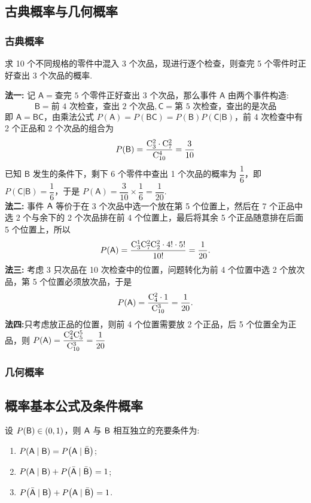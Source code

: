 \subsection{古典概率与几何概率}

\subsubsection{古典概率}

\begin{example}
    求 10 个不同规格的零件中混入 3 个次品，现进行逐个检查，则查完 5 个零件时正好查出 3 个次品的概率.
\end{example}
\begin{solution}
    \textbf{法一: }记 $\mathsf{A}=\text{查完 5 个零件正好查出 3 个次品}$，那么事件 $\mathsf{A}$ 由两个事件构造: $$\mathsf{B}=\text{前 4 次检查，查出 2 个次品},\mathsf{C}=\text{第 5 次检查，查出的是次品}$$
    即 $\mathsf{A}=\mathsf{BC}$，由乘法公式 $P(\mathsf{A})=P(\mathsf{BC})=P(\mathsf{B})P(\mathsf{C}|\mathsf{B})$，前 4 次检查中有 2 个正品和 2 个次品的组合为
    $$P(\mathsf{B})=\dfrac{\mathrm{C}_3^2\cdot\mathrm{C}_7^2}{\mathrm{C}_{10}^4}=\dfrac{3}{10}$$
    已知 $\mathsf{B}$ 发生的条件下，剩下 6 个零件中查出 1 个次品的概率为 $\dfrac{1}{6}$，即 $P(\mathsf{C}|\mathsf{B})=\dfrac{1}{6}$，于是 $P(\mathsf{A})=\dfrac{3}{10}\times\dfrac{1}{6}=\dfrac{1}{20}.$\\
    \textbf{法二: }事件 $\mathsf{A}$ 等价于在 3 个次品中选一个放在第 5 个位置上，然后在 7 个正品中选 2 个与余下的 2 个次品排在前 4 个位置上，最后将其余 5 个正品随意排在后面 5 个位置上，所以
    $$P(\mathsf{A})=\dfrac{\mathrm{C}_3^1\mathrm{C}_7^2\mathrm{C}_2^2\cdot 4!\cdot5!}{10!}=\dfrac{1}{20}.$$
    \textbf{法三: }考虑 3 只次品在 10 次检查中的位置，问题转化为前 4 个位置中选 2 个放次品，第 5 个位置必须放次品，于是 $$P(\mathsf{A})=\dfrac{\mathrm{C}_4^2\cdot1}{\mathrm{C}_{10}^3}=\dfrac{1}{20}.$$
    \textbf{法四:}只考虑放正品的位置，则前 4 个位置需要放 2 个正品，后 5 个位置全为正品，则 $P(\mathsf{A})=\dfrac{\mathrm{C}_4^2\mathrm{C}_5^5}{\mathrm{C}_{10}^3}=\dfrac{1}{20}$
\end{solution}

\subsubsection{几何概率}

\subsection{概率基本公式及条件概率}

\begin{theorem}[与独立有关的条件概率]
    设 $P(\mathsf{B})\in(0,1)$，则 $\mathsf{A} $ 与 $\mathsf{B}$ 相互独立的充要条件为:
    \begin{enumerate}[label=(\arabic{*})]
        \item $P(\mathsf{A}\mid\mathsf{B})=P\qty(\mathsf{A}\mid \bar{\mathsf{B}})$;
        \item $P(\mathsf{A}\mid\mathsf{B})+P\qty(\bar{\mathsf{A}}\mid \bar{\mathsf{B}})=1$;
        \item $P\qty(\bar{\mathsf{A}}\mid \mathsf{B})+P\qty(\mathsf{A}\mid \bar{\mathsf{B}})=1$.
    \end{enumerate}
\end{theorem}

